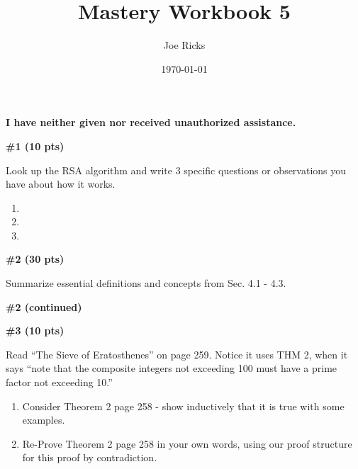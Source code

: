 \documentclass{article}
\title{Mastery Workbook 5}
\author{Joe Ricks}
\date{\today}
\newcommand{\sectionbreak}{\clearpage}
\begin{document}
\maketitle

\textbf{\Huge I have neither given nor received unauthorized assistance.}

\sectionbreak

\textbf{\#1 (10 pts)}

\bigbreak

Look up the RSA algorithm and write 3 specific questions or observations you have about how it works.

\bigbreak

\begin{enumerate}
    \item

    \bigbreak

    \item

    \bigbreak

    \item

\end{enumerate}

\sectionbreak

\textbf{\#2 (30 pts)}

\bigbreak

Summarize essential definitions and concepts from Sec. 4.1 - 4.3.

\bigbreak



\sectionbreak

\textbf{\#2 (continued)}

\bigbreak



\sectionbreak

\textbf{\#3 (10 pts)}

\bigbreak

Read ``The Sieve of Eratosthenes'' on page 259. Notice it uses THM 2, when it says ``note that the composite integers not exceeding 100 must have a prime factor not exceeding 10.''

\bigbreak

\begin{enumerate}[label=\Alph*.]
    \item Consider Theorem 2 page 258 - show inductively that it is true with some examples.

    \bigbreak



    \bigbreak

    \item Re-Prove Theorem 2 page 258 in your own words, using our proof structure for this proof by contradiction.

    \bigbreak



\end{enumerate}
\end{document}

